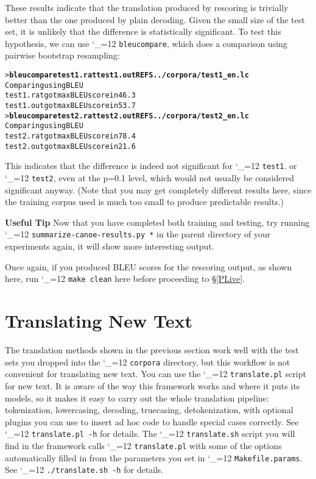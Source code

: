 \documentclass[11pt,letterpaper]{article}
\def\code{\begingroup\catcode`\_=12 \codex}
\newcommand{\codex}[1]{\texttt{#1}\endgroup}
\newcommand{\tip}{\textbf{Useful Tip \large{\ding{43}} }}
\newcommand{\margintip}{\marginpar[{\textbf{Tip \large{\ding{43}}}}]{\textbf{\reflectbox{\large{\ding{43}}} Tip}}}
\newcommand{\tipend}{\textbf{ \reflectbox{\large{\ding{43}}}}}
\begin{document}
These results indicate that the translation produced by rescoring is trivially better
than the one produced by plain decoding. Given the small size of the test set,
it is unlikely that the difference is statistically significant. To test
this hypothesis, we can use \code{bleucompare}, which does a comparison using
pairwise bootstrap resampling:
\begin{small}
\begin{alltt}
   > \textbf{bleucompare test1.rat test1.out REFS ../corpora/test1_en.lc}
   Comparing using BLEU
   test1.rat got max BLEU score in 46.3% of samples
   test1.out got max BLEU score in 53.7% of samples
   > \textbf{bleucompare test2.rat test2.out REFS ../corpora/test2_en.lc}
   Comparing using BLEU
   test2.rat got max BLEU score in 78.4% of samples
   test2.out got max BLEU score in 21.6% of samples
\end{alltt}
\end{small}
This indicates that the difference is indeed not significant for \code{test1}.
or \code{test2}, even at the p=0.1 level, which would not
usually be considered significant anyway.  (Note that you may get completely
different results here, since the training corpus used is much too small to
produce predictable results.)

\tip \margintip Now that you have completed both training and testing, try
running \code{summarize-canoe-results.py *} in the parent directory of your
experiments again, it will show more interesting output.\tipend

Once again, if you produced BLEU scores for the rescoring output, as shown
here, run \code{make clean} here before proceeding to \S\ref{PLive}.

\section{Translating New Text} \label{NewText}

The translation methods shown in the previous section work well with the test
sets you dropped into the \code{corpora} directory, but this workflow is not
convenient for translating new text.  You can use the \code{translate.pl} script
for new text. It is aware of the way this framework works and where it puts its
models, so it makes it easy to carry out the whole translation pipeline:
tokenization, lowercasing, decoding, truecasing, detokenization, with optional
plugins you can use to insert ad hoc code to handle special cases correctly. 
See \code{translate.pl -h} for details.  The \code{translate.sh} script you will
find in the framework calls \code{translate.pl} with some of the options
automatically filled in from the parameters you set in \code{Makefile.params}.
See \code{./translate.sh -h} for details.
\end{document}
